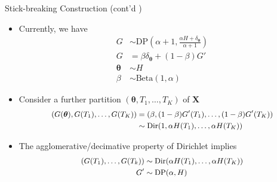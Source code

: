 \documentclass[10pt,mathserif]{beamer}
\begin{document}
\begin{frame}{Stick-breaking Construction (cont'd )}
\begin{itemize}
    \item Currently, we have
    \begin{equation*}
        \begin{split}
            G & \sim \text{DP}(\alpha + 1, \frac{\alpha H + \delta_{\bm{\theta}}}{\alpha+1})\\
            G & = \beta\delta_{\bm{\theta}} + (1-\beta)G' \\
            \bm{\theta} & \sim H\\
            \beta & \sim \text{Beta}(1,\alpha)   
        \end{split}
    \end{equation*}
    \item Consider a further partition $(\bm{\theta}, T_1, \ldots, T_K)$ of $\bm{X}$
    \begin{equation*}\small
        \begin{split}
            (G(\bm{\theta}), G(T_1), \ldots, G(T_K))  & =   (\beta,(1-\beta)G'(T_1),\ldots,(1-\beta)G'(T_K))\\ 
            & \sim \text{Dir}(1, \alpha H(T_1),\ldots, \alpha H(T_K))
        \end{split}
    \end{equation*}
    \item The agglomerative/decimative property of Dirichlet implies
    \begin{equation*}\small
        \begin{split}
            (G(T_1),\ldots,G(T_k)) & \sim \text{Dir}(\alpha H(T_1),\ldots, \alpha H(T_K )) \\
            G' & \sim \text{DP}(\alpha,H)
        \end{split}
    \end{equation*}
\end{itemize}    
\end{frame}
\end{document}
